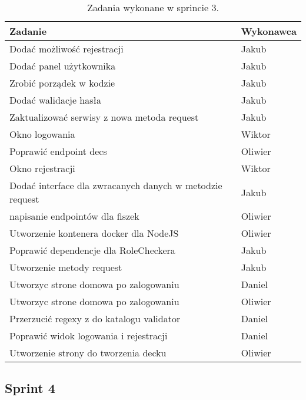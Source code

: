 \begin{table}[H]
\centering
\begin{tabularx}{\textwidth}{|p{}|X|}
    \hline
    \textbf{Zadanie} & \textbf{Wykonawca} \\
    \hline
    [MOBILE] Dodać możliwość rejestracji & Jakub \\
    \hline
    [MOBILE] Dodać panel użytkownika & Jakub \\
    \hline
    [MOBILE] Zrobić porządek w kodzie & Jakub \\
    \hline
    [MOBILE] Dodać walidacje hasła & Jakub \\
    \hline
    [MOBILE] Zaktualizować serwisy z nowa metoda request & Jakub \\
    \hline
    [WEB] Okno logowania & Wiktor \\
    \hline
    [BACKEND] Poprawić endpoint decs & Oliwier \\
    \hline
    [WEB] Okno rejestracji & Wiktor \\
    \hline
    [MOBILE] Dodać interface dla zwracanych danych w metodzie request & Jakub \\
    \hline
    [BACKEND] napisanie endpointów dla fiszek & Oliwier \\
    \hline
    [WEB] Utworzenie kontenera docker dla NodeJS & Oliwier \\
    \hline
    [BACKEND] Poprawić dependencje dla RoleCheckera & Jakub \\
    \hline
    [MOBILE] Utworzenie metody request & Jakub \\
    \hline
    [MOBILE] Utworzyc strone domowa po zalogowaniu & Daniel \\
    \hline
    [WEB] Utworzyc strone domowa po zalogowaniu & Oliwier \\
    \hline
    [MOBILE] Przerzucić regexy z do katalogu validator & Daniel \\
    \hline
    [MOBILE] Poprawić widok logowania i rejestracji & Daniel \\
    \hline
    [WEB] Utworzenie strony do tworzenia decku & Oliwier \\
    \hline
\end{tabularx}
        \caption{Zadania wykonane w sprincie 3.}
\end{table}

\subsection{Sprint 4}

